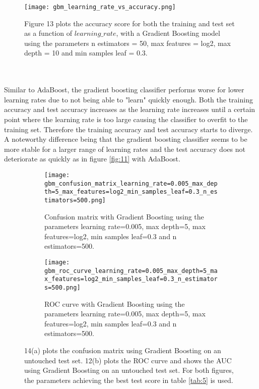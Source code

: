 \documentclass[a4paper,twocolumn]{article}
\begin{document}
\begin{figure}[ht]
    \centering
    \texttt{[image: gbm\_learning\_rate\_vs\_accuracy.png]}
    \caption{Figure 13 plots the accuracy score for both the training and test set as a function of $learning\_rate$, with a Gradient Boosting model using the parameters n estimators = 50, max features = log2, max depth = 10 and min samples leaf = 0.3.}
    \label{fig:13}
\end{figure}\\
\\
Similar to AdaBoost, the gradient boosting classifier performs worse for lower learning rates due to not being able to "learn" quickly enough. Both the training accuracy and test accuracy increases as the learning rate increases until a certain point where the learning rate is too large causing the classifier to overfit to the training set. Therefore the training accuracy and test accuracy starts to diverge. A noteworthy difference being that the gradient boosting classifier seems to be more stable for a larger range of learning rates and the test accuracy does not deteriorate as quickly as in figure \ref{fig:11} with AdaBoost.\\
\begin{figure}[!ht]
    \centering
    \begin{subfigure}[b]{\columnwidth}
        \texttt{[image: gbm\_confusion\_matrix\_learning\_rate=0.005\_max\_depth=5\_max\_features=log2\_min\_samples\_leaf=0.3\_n\_estimators=500.png]}
        \caption{Confusion matrix with Gradient Boosting using the parameters learning rate=0.005, max depth=5, max features=log2, min samples leaf=0.3 and n estimators=500.}
        \label{fig:14a}
    \end{subfigure}
    
    \begin{subfigure}[b]{\columnwidth}
        \texttt{[image: gbm\_roc\_curve\_learning\_rate=0.005\_max\_depth=5\_max\_features=log2\_min\_samples\_leaf=0.3\_n\_estimators=500.png]}
        \caption{ROC curve with Gradient Boosting using the parameters learning rate=0.005, max depth=5, max features=log2, min samples leaf=0.3 and n estimators=500.}
        \label{fig:12b}
    \end{subfigure}
    \caption{14(a) plots the confusion matrix using Gradient Boosting on an untouched test set. 12(b) plots the ROC curve and shows the AUC using Gradient Boosting on an untouched test set. For both figures, the parameters achieving the best test score in table \ref{tab:5} is used.}
    \label{fig:14}
\end{figure}\\
\end{document}
